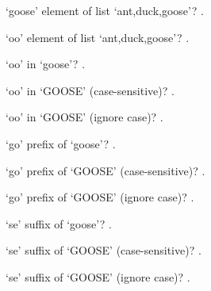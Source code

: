 \documentclass[12pt]{article}
\begin{document}
`goose' element of list `ant,duck,goose'?
. 

`oo' element of list `ant,duck,goose'?
. 

`oo' in `goose'?
. 

`oo' in `GOOSE' (case-sensitive)?
. 

`oo' in `GOOSE' (ignore case)?
. 

`go' prefix of `goose'?
. 

`go' prefix of `GOOSE' (case-sensitive)?
. 

`go' prefix of `GOOSE' (ignore case)?
. 

`se' suffix of `goose'?
. 

`se' suffix of `GOOSE' (case-sensitive)?
. 

`se' suffix of `GOOSE' (ignore case)?
. 
\end{document}
